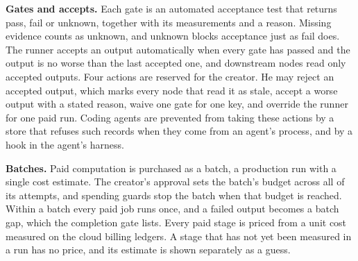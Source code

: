 \textbf{Gates and accepts.} Each gate is an automated acceptance test that returns pass, fail or unknown, together with its measurements and a reason. Missing evidence counts as unknown, and unknown blocks acceptance just as fail does. The runner accepts an output automatically when every gate has passed and the output is no worse than the last accepted one, and downstream nodes read only accepted outputs. Four actions are reserved for the creator. He may reject an accepted output, which marks every node that read it as stale, accept a worse output with a stated reason, waive one gate for one key, and override the runner for one paid run. Coding agents are prevented from taking these actions by a store that refuses such records when they come from an agent's process, and by a hook in the agent's harness.

\textbf{Batches.} Paid computation is purchased as a batch, a production run with a single cost estimate. The creator's approval sets the batch's budget across all of its attempts, and spending guards stop the batch when that budget is reached. Within a batch every paid job runs once, and a failed output becomes a batch gap, which the completion gate lists. Every paid stage is priced from a unit cost measured on the cloud billing ledgers. A stage that has not yet been measured in a run has no price, and its estimate is shown separately as a guess.
